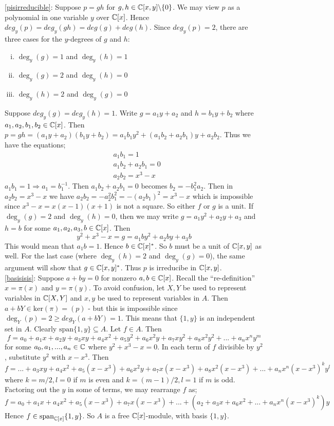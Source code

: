 \begin{solution}
\eqref{pisirreducible}: Suppose $p = gh $ for $g,h \in \mathbb{C}[x,y] \backslash \lbrace 0 \rbrace $. 
We may view $p$ as a polynomial in one variable $y$ over $\mathbb{C}[x]$. 
Hence $deg_y(p)= deg_y(gh) = deg(g) + deg(h)$. Since $deg_y(p)=2$, 
there are three cases for the $y$-degrees of $g$ and $h$: 
\begin{enumerate}[(i)]
\item $\deg_y(g) = 1$ and $\deg_y(h) = 1$ 
\item $\deg_y(g) = 2$ and $\deg_y(h) = 0$ 
\item $\deg_y(h) = 2$ and $\deg_y(g) = 0$
\end{enumerate}
Suppose $deg_y(g)=deg_y(h)=1$. 
Write $g= a_1y + a_2$ and $h= b_1y + b_2$ where
$a_1,a_2,b_1,b_2 \in \mathbb{C}[x]$. 
Then $p = gh = (a_1y + a_2)(b_1y + b_2) = a_1b_1y^2 + (a_1b_2 + a_2b_1)y + a_2b_2 $.
Thus we have the equations;
\begin{align*}
&a_1b_1 = 1  \\
&a_1b_2 + a_2b_1 = 0 \\
&a_2b_2 = x^3 - x 
\end{align*} 
$a_1b_1 = 1 \Longrightarrow a_1 = b_1^{-1}$. 
Then $a_1b_2 + a_2b_1 = 0$ becomes
$b_2=- b_1^2a_2$. Then in $a_2b_2 = x^3 - x $ we have
$a_2b_2 = - a_2^2b_1^2 = - (a_2b_1)^2 = x^3 - x$ which is 
impossible since $x^3 - x = x(x-1)(x+1)$ is not a 
square. So either $f$ or $g$ is a unit. 
If $\deg_y(g) = 2$ and $\deg_y(h) = 0$, then we 
may write $g = a_1y^2 + a_2y + a_3$ and $h = b$ for some 
$a_1,a_2,a_3,b \in \mathbb{C}[x]$. 
Then $$y^2 +x^3 - x = g = a_1by^2 + a_2by + a_3b$$
This would mean that $a_1b= 1$. Hence $b \in \mathbb{C}[x]^* $.
So $b$ must be a unit of $\mathbb{C}[x,y]$ as well. For the last
case (where $\deg_y(h) = 2$ and $\deg_y(g) = 0$), the same 
argument will show that $g \in \mathbb{C}[x,y]^*$.
Thus $p$ is irreducibe in $\mathbb{C}[x,y]$.  \\

\eqref{basisisis}: Suppose $a+by = 0$ for nonzero $a,b \in \mathbb{C}[x]$. 
Recall the ``re-definition'' $x = \pi(x)$ and $y = \pi(y)$. To 
avoid confusion, let $X,Y$ be used to represent variables in 
$\mathbb{C}[X,Y]$ and $x,y$ be used to represent variables in $A$. 
Then $a+bY \in \text{ker}(\pi) = (p)$ - but this is impossible since 
$\deg_Y(p) = 2 \geq deg_Y(a+bY) = 1$. This means that $\lbrace 1,y \rbrace$
is an independent set in $A$. Clearly $\text{span} \lbrace 1,y \rbrace \subseteq A$.
Let $f \in A$. Then $$f = a_0 + a_ 1x + a_2y + a_3xy + a_4 x^2 
+ a_5y^2 + a_6x^2y + a_7xy^2 + a_8x^2y^2 + ... + a_nx^ny^m$$
for some $a_0,a_1,...,a_n \in \mathbb{C}$ where $y^2+x^3 - x = 0$. 
In each term of $f$ divisible by $y^2$, substitute $y^2$ with $x - x^3$. 
Then $$f = ... + a_3xy + a_4 x^2 + a_5(x - x^3) + a_6x^2y + a_7x(x - x^3) 
+ a_8x^2(x - x^3) + ... + a_nx^n(x - x^3)^ky^l$$
where $k = m/2, l = 0$ if $m$ is even and $k = (m-1)/2, l = 1$ if $m$ is odd.
Factoring out the $y$ in some of terms, we may rearrange $f$ as;
$$f =  a_0 + a_ 1x +  a_4 x^2  + a_5(x - x^3)  + a_7x(x - x^3) + ... + 
(a_2 +  a_3x  + a_6x^2 + ... +a_nx^n(x - x^3)^k)y $$
Hence $f \in \text{span}_{\mathbb{C}[x]} \lbrace 1,y \rbrace$. 
So $A$ is a free $\mathbb{C}[x]$-module, with basis $\{ 1, y \}$.\\


\end{solution}
